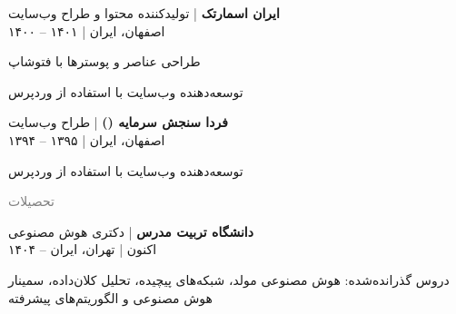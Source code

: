 \documentclass[a4paper]{deedy-persian} %
\begin{document}
\begin{minipage}[t]{0.62\textwidth} %
\small


\textbf{ایران اسمارتک} | تولیدکننده محتوا و طراح وب‌سایت \\
\vspace{\itemsep} %
۱۴۰۰ – ۱۴۰۱ | اصفهان، ایران
\vspace{\itemsep} %
\begin{tightitemize}
\item طراحی عناصر و پوسترها با فتوشاپ
\item توسعه‌دهنده وب‌سایت با استفاده از وردپرس
\end{tightitemize}
\vspace{\topsep} %


\textbf{فردا سنجش سرمایه ()} | طراح وب‌سایت \\
\vspace{\itemsep} 
۱۳۹۴ – ۱۳۹۵ | اصفهان، ایران
\vspace{\itemsep} %
\begin{tightitemize}
\item توسعه‌دهنده وب‌سایت با استفاده از وردپرس
\end{tightitemize}
\vspace{\topsep} %

\textcolor{gray}{\huge {تحصیلات}}
\vspace{\topsep} %

\textbf{دانشگاه تربیت مدرس} | دکتری هوش مصنوعی \\
\vspace{\itemsep}
۱۴۰۴ – اکنون | تهران، ایران
\vspace{\itemsep}
\begin{tightitemize}
\item دروس گذرانده‌شده: هوش مصنوعی مولد، شبکه‌های پیچیده، تحلیل کلان‌داده، سمینار هوش مصنوعی و الگوریتم‌های پیشرفته
\end{tightitemize}
\sectionspace


\end{minipage}
\end{document}
